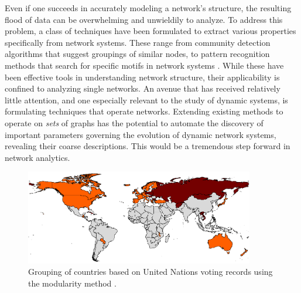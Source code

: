 \documentclass[11pt]{article}
\begin{document}
\indent Even if one succeeds in accurately modeling a network's structure, the resulting flood of data can be overwhelming and unwieldily to analyze. To address this problem, a class of techniques have been formulated to extract various properties specifically from network systems. These range from community detection algorithms that suggest groupings of similar nodes, to pattern recognition methods that search for specific motifs in network systems \cite{Zager2008} \cite{Kleinberg1999} \cite{Newman2004} \cite{neuralnetwork pattern recog}. While these have been effective tools in understanding network structure, their applicability is confined to analyzing single networks. An avenue that has received relatively little attention, and one especially relevant to the study of dynamic systems, is formulating techniques that operate  networks. Extending existing methods to operate on \textit{sets} of graphs has the potential to automate the discovery of important parameters governing the evolution of dynamic network systems, revealing their coarse descriptions. This would be a tremendous step forward in network analytics.\vspace{1mm}\\
\begin{figure}[h!]
  \centering
  \includegraphics[width=10cm]{unCommunityDetection}
  \caption{Grouping of countries based on United Nations voting records using the modularity method \cite{porter}.}
  \label{fig:un}
\end{figure}
\vspace{1mm}\\
\end{document}
